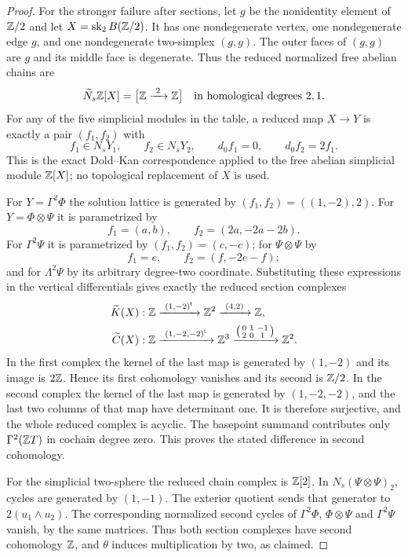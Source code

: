 \begin{proof}
For the stronger failure after sections, let $g$ be the nonidentity
element of $\mathbb Z/2$ and let $X=\operatorname{sk}_2 B(\mathbb Z/2)$.
It has one nondegenerate vertex, one nondegenerate edge $g$, and
one nondegenerate two-simplex $(g,g)$. The outer faces of $(g,g)$
are $g$ and its middle face is degenerate. Thus the reduced
normalized free abelian chains are
\[
 \widetilde N_s\mathbb Z[X]
   =\bigl[\mathbb Z\xrightarrow{\ 2\ }\mathbb Z\bigr]
 \quad\text{in homological degrees }2,1.
\]
For any of the five simplicial modules in the table, a reduced map
$X\to Y$ is exactly a pair $(f_1,f_2)$ with
\[
 f_1\in N_sY_1,\qquad f_2\in N_sY_2,
 \qquad d_0f_1=0,\qquad d_0f_2=2f_1.
\]
This is the exact Dold--Kan correspondence applied to the free
abelian simplicial module $\mathbb Z[X]$; no topological replacement of
$X$ is used.

For $Y=\Gamma^2\Phi$ the solution lattice is generated by
$(f_1,f_2)=((1,-2),2)$. For $Y=\Phi\otimes\Psi$ it is
parametrized by
\[
 f_1=(a,b),\qquad f_2=(2a,-2a-2b).
\]
For $\Gamma^2\Psi$ it is parametrized by $(f_1,f_2)=(c,-c)$;
for $\Psi\otimes\Psi$ by
\[
 f_1=e,\qquad f_2=(f,-2e-f);
\]
and for $\Lambda^2\Psi$ by its arbitrary degree-two coordinate.
Substituting these expressions in the vertical differentials gives
exactly the reduced section complexes
\begin{align*}
 \widetilde K(X)&:
 \mathbb Z\xrightarrow{\ (1,-2)^{\mathsf t}\ }\mathbb Z^2
       \xrightarrow{\ (4,2)\ }\mathbb Z,\\
 \widetilde C(X)&:
 \mathbb Z\xrightarrow{\ (1,-2,-2)^{\mathsf t}\ }\mathbb Z^3
       \xrightarrow{\left(\begin{smallmatrix}0&1&-1\\2&0&1\end{smallmatrix}\right)}
       \mathbb Z^2.
\end{align*}
In the first complex the kernel of the last map is generated by
$(1,-2)$ and its image is $2\mathbb Z$. Hence its first cohomology
vanishes and its second is $\mathbb Z/2$. In the second complex the
kernel of the last map is generated by $(1,-2,-2)$, and the last
two columns of that map have determinant one. It is therefore
surjective, and the whole reduced complex is acyclic. The
basepoint summand contributes only $\Gamma^2(\mathbb Z T)$ in cochain
degree zero. This proves the stated difference in second
cohomology.

For the simplicial two-sphere the reduced chain complex is
$\mathbb Z[2]$. In $N_s(\Psi\otimes\Psi)_2$, cycles are generated by
$(1,-1)$. The exterior quotient sends that generator to
$2(u_1\wedge u_2)$. The corresponding normalized second cycles
of $\Gamma^2\Phi$, $\Phi\otimes\Psi$ and $\Gamma^2\Psi$
vanish, by the same matrices. Thus both section complexes have
second cohomology $\mathbb Z$, and $\theta$ induces multiplication by
two, as claimed.


\end{proof}
